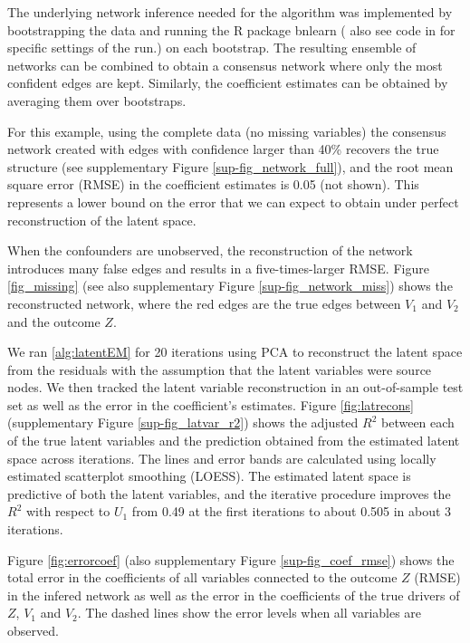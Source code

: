 \documentclass[letterpaper]{article}
\begin{document}
The underlying network inference needed for the algorithm was implemented by bootstrapping the data  and running the R package bnlearn (\cite{scutari_learning_2010} also see code in \cite{latent_2020} for specific settings of the run.) on each bootstrap.  The resulting ensemble of networks can be combined to obtain a consensus network where only the most confident edges are kept. Similarly, the coefficient estimates can be obtained by averaging them over bootstraps.

For this example, using the complete data (no missing variables) the consensus network created with edges with confidence larger than 40\% recovers the true structure (see supplementary Figure \ref{sup-fig_network_full}), and the root mean square error (RMSE) in the coefficient estimates is 0.05 (not shown). This represents a lower
bound on the error that we can expect to obtain under perfect reconstruction of the latent space.

When the confounders are unobserved, the reconstruction of the network introduces many false edges and results in a five-times-larger RMSE. Figure \ref{fig_missing} (see also supplementary Figure \ref{sup-fig_network_miss}) shows the reconstructed network, where the red edges are the true edges between $V_1$ and $V_2$ and the outcome $Z$.

We ran \ref{alg:latentEM} for 20 iterations using PCA to reconstruct the latent space from the residuals with the assumption that the latent variables were source nodes. We then tracked the latent variable reconstruction in an out-of-sample test set as well as the error in the coefficient's estimates. Figure \ref{fig:latrecons} (supplementary Figure \ref{sup-fig_latvar_r2}) shows the adjusted $R^2$ between each of the true latent variables and the prediction obtained from the estimated latent space across iterations. The lines and error bands are calculated using locally estimated scatterplot smoothing (LOESS). The estimated latent space is predictive of both the latent variables, and the iterative procedure improves the $R^2$ with respect to $U_1$ from 0.49 at the first iterations to about 0.505 in about 3 iterations.

Figure \ref{fig:errorcoef} (also supplementary Figure \ref{sup-fig_coef_rmse}) shows the total error in the coefficients
of all variables connected to the outcome $Z$ (RMSE) in the infered network as
well as the error in the coefficients of the true drivers of $Z$, $V_1$
and $V_2$. The dashed lines show the error levels when all variables are observed.
\end{document}
